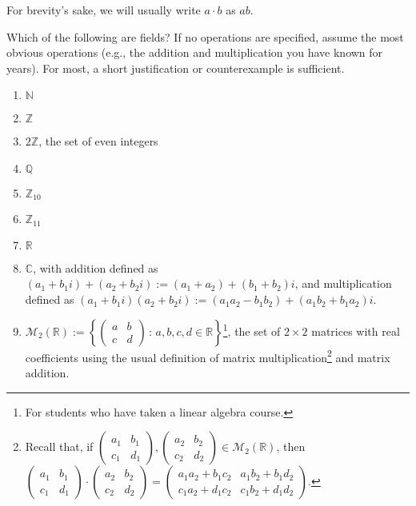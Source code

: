 \documentclass[english,course]{lecture}
\theoremstyle{plain}
\def\setof#1#2{{\left\{#1\,\colon\,#2\right\}}}
\def\C{{\mathbb C}}
\def\Z{{\mathbb Z}}
\def\Q{{\mathbb Q}}
\def\N{{\mathbb N}}
\def\R{{\mathbb R}}
\begin{document}
For brevity's sake, we will usually write $a\cdot b$ as $ab$.


\begin{exer}\label{exer:fieldexamples}
	Which of the following are fields? If no operations are specified, assume the most obvious operations (e.g., the addition and multiplication you have known for years). For most, a short justification or counterexample is sufficient.
	\begin{enumerate}
		\item $\N$
		\item $\Z$
		\item $2\Z$, the set of even integers
		\item $\Q$
		\item $\Z_{10}$
		\item $\Z_{11}$
		\item $\R$
		\item $\C$, with addition defined as $(a_1 + b_1 i) + (a_2 + b_2 i) := (a_1 + a_2) + (b_1 + b_2)i$, and multiplication defined as $(a_1 + b_1 i)(a_2 + b_2 i) := (a_1 a_2 - b_1 b_2) + (a_1 b_2 + b_1 a_2) i$. 
		\item $\mathcal{M}_2(\R) := \setof{\left(\begin{matrix} a & b \\ c & d \end{matrix}\right)}{a,b,c,d\in\R}$\footnote{For students who have taken a linear algebra course.}, the set of $2\times 2$ matrices with real coefficients using the usual definition of matrix multiplication\footnote{Recall that, if $\left(\begin{matrix} a_1 & b_1 \\ c_1 & d_1 \end{matrix}\right), \left(\begin{matrix} a_2 & b_2 \\ c_2 & d_2 \end{matrix}\right)\in \mathcal{M}_2(\R)$, then $\left(\begin{matrix} a_1 & b_1 \\ c_1 & d_1 \end{matrix}\right) \cdot \left(\begin{matrix} a_2 & b_2 \\ c_2 & d_2 \end{matrix}\right) = \left(\begin{matrix} a_1 a_2 + b_1 c_2 & a_1 b_2 + b_1 d_2 \\ c_1 a_2 + d_1 c_2 & c_1 b_2 + d_1 d_2 \end{matrix}\right)$.} and matrix addition.
	\end{enumerate}
\end{exer}
\end{document}
